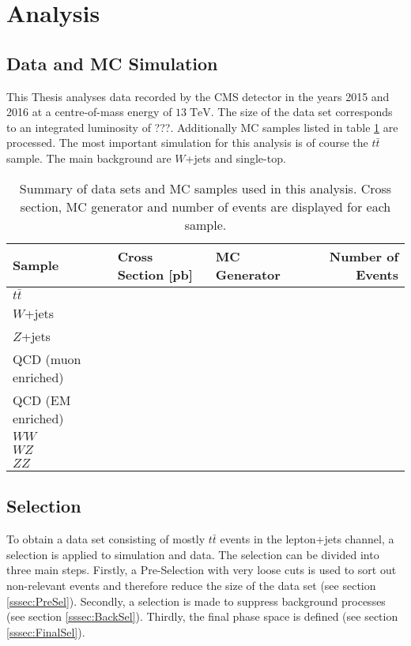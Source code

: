 \section{Analysis}
\subsection{Data and MC Simulation}
	This Thesis analyses data recorded by the CMS detector in the years 2015 and 2016 at a centre-of-mass energy of $13\;\text{TeV}$. The size of the data set corresponds to an integrated luminosity of ???. Additionally MC samples listed in table \ref{MC_Tab} are processed. The most important simulation for this analysis is of course the $t\bar{t}$ sample. The main background are $W$+jets and single-top. 
\begin{landscape}
	\begin{table}
	\centering
	 \begin{tabular}{|l|l|l|r|}
	 	\hline
	 	Sample & Cross Section [pb] & MC Generator & Number of Events \\
	 	\hline
	 	$t\bar{t}$ & & & \\
		\hline
	 	$W$+jets & & & \\
	 	$Z$+jets & & & \\
	 	QCD (muon enriched) & & & \\
	 	QCD (EM enriched) & & & \\
	 	$WW$ & & & \\
	 	$WZ$ & & & \\
	 	$ZZ$ & & & \\
	 	 \hline
	 \end{tabular}
	\caption{Summary of data sets and MC samples used in this analysis. Cross section, MC generator and number of events are displayed for each sample.}
	\label{MC_Tab}	
	\end{table}
	\end{landscape}
\subsection{Selection}
	To obtain a data set consisting of mostly $t\bar{t}$ events in the lepton+jets channel, a selection is applied to simulation and data. The selection can be divided into three main steps. Firstly, a Pre-Selection with very loose cuts is used to sort out non-relevant events and therefore reduce the size of the data set (see section \ref{sssec:PreSel}). Secondly, a selection is made to suppress background processes (see section \ref{sssec:BackSel}). Thirdly, the final phase space is defined (see section \ref{sssec:FinalSel}).
